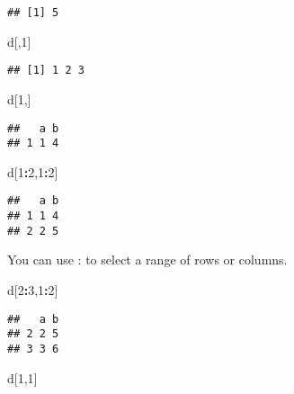 \documentclass[
]{article}
\newenvironment{Shaded}{\begin{snugshade}}{\end{snugshade}}
\newcommand{\DecValTok}[1]{\textcolor[rgb]{0.00,0.00,0.81}{#1}}
\newcommand{\NormalTok}[1]{#1}
\newcommand{\OperatorTok}[1]{\textcolor[rgb]{0.81,0.36,0.00}{\textbf{#1}}}
\begin{document}
\begin{verbatim}
## [1] 5
\end{verbatim}

\begin{Shaded}
\begin{Highlighting}[]
\NormalTok{d[,}\DecValTok{1}\NormalTok{]}
\end{Highlighting}
\end{Shaded}

\begin{verbatim}
## [1] 1 2 3
\end{verbatim}

\begin{Shaded}
\begin{Highlighting}[]
\NormalTok{d[}\DecValTok{1}\NormalTok{,]}
\end{Highlighting}
\end{Shaded}

\begin{verbatim}
##   a b
## 1 1 4
\end{verbatim}

\begin{Shaded}
\begin{Highlighting}[]
\NormalTok{d[}\DecValTok{1}\OperatorTok{:}\DecValTok{2}\NormalTok{,}\DecValTok{1}\OperatorTok{:}\DecValTok{2}\NormalTok{]}
\end{Highlighting}
\end{Shaded}

\begin{verbatim}
##   a b
## 1 1 4
## 2 2 5
\end{verbatim}

You can use : to select a range of rows or columns.

\begin{Shaded}
\begin{Highlighting}[]
\NormalTok{d[}\DecValTok{2}\OperatorTok{:}\DecValTok{3}\NormalTok{,}\DecValTok{1}\OperatorTok{:}\DecValTok{2}\NormalTok{]}
\end{Highlighting}
\end{Shaded}

\begin{verbatim}
##   a b
## 2 2 5
## 3 3 6
\end{verbatim}

\begin{Shaded}
\begin{Highlighting}[]
\NormalTok{d[}\DecValTok{1}\NormalTok{,}\DecValTok{1}\NormalTok{]}
\end{Highlighting}
\end{Shaded}
\end{document}
